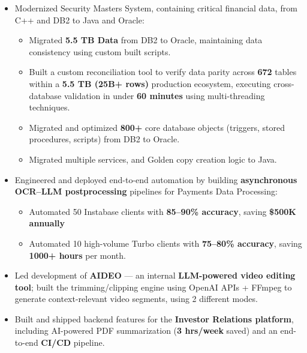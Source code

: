 \documentclass[a4paper,10pt]{article}
\newenvironment{zitemize}{
\begin{itemize}\itemsep0pt \parskip0pt \parsep1pt}
{\end{itemize}\vspace{-0.7cm}}
\begin{document}
\begin{zitemize}
\item Modernized Security Masters System, containing critical financial data, from C++ and DB2 to Java and Oracle: \vspace{-2pt}
\begin{itemize}
    \setlength{\itemsep}{-1pt}
    \setlength{\parsep}{0pt}
    \setlength{\topsep}{10pt}
    \setlength{\partopsep}{0pt}
    \item[-] Migrated  \textbf{5.5 TB Data} from DB2 to Oracle, maintaining data consistency using custom built scripts.
    \item[-] Built a custom reconciliation tool to verify data parity across \textbf{672} tables within a \textbf{5.5 TB (25B+ rows)} production ecosystem, executing cross-database validation in under \textbf{60 minutes}  using multi-threading techniques.
    \item[-] Migrated and optimized \textbf{800+} core database objects (triggers, stored procedures, scripts) from DB2 to Oracle.
    \item[-] Migrated multiple services, and Golden copy creation logic to Java.
\end{itemize}


\item Engineered and deployed end-to-end automation by building \textbf{asynchronous OCR--LLM postprocessing} pipelines for Payments Data Processing: \vspace{-0.15cm}
\begin{itemize}
    \item[-] Automated 50 Instabase clients with \textbf{85--90\% accuracy}, saving \textbf{\$500K annually}  \vspace{-0.15cm}
    \item[-] Automated 10 high-volume Turbo clients with \textbf{75--80\% accuracy}, saving \textbf{1000+ hours} per month. \vspace{-0.10cm}
\end{itemize}

\item Led development of \textbf{AIDEO} — an internal \textbf{LLM-powered video editing tool}; built the trimming/clipping engine using OpenAI APIs + FFmpeg to generate context-relevant video segments, using 2 different modes.

\item Built and shipped backend features for the \textbf{Investor Relations platform}, including AI-powered PDF summarization (\textbf{3 hrs/week} saved) and an end-to-end \textbf{CI/CD} pipeline.


\end{zitemize}
\end{document}
